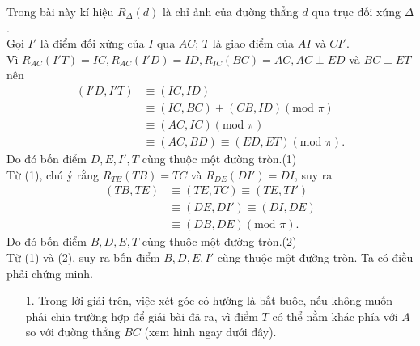 \begin{bt}
{\begin{center}
\begin{tikzpicture}
			\end{tikzpicture}
		\end{center}
		Trong bài này kí hiệu $R_{\Delta}(d)$ là chỉ ảnh của đường thẳng $d$ qua trục đối xứng $\Delta$.\\
		Gọi $I'$ là điểm đối xứng của $I$ qua $AC$; $T$ là giao điểm của $AI$ và $CI'$.\\
		Vì $R_{AC}(I'T)=IC,R_{AC}(I'D)=ID,R_{IC}(BC)=AC,AC\perp ED$ và $BC\perp ET$ nên 
		\begin{align*}
		(I'D,I'T)&\equiv (IC,ID)\\ &\equiv (IC,BC)+(CB,ID)(\text{mod } \pi)\\&\equiv (AC,IC)(\text{mod }\pi)\\&\equiv(AC,BD)\equiv (ED,ET)(\text{mod }\pi).
		\end{align*}
		Do đó bốn điểm $D,E,I',T$ cùng thuộc một đường tròn.\hfill(1)\\
		Từ (1), chú ý rằng $R_{TE}(TB)=TC$ và $R_{DE}(DI')=DI$, suy ra
		\begin{align*}
		(TB,TE)&\equiv (TE,TC)\equiv(TE,TI')\\ &\equiv (DE,DI')\equiv(DI,DE)\\&\equiv (DB,DE)(\text{mod }\pi).
		\end{align*}
		Do đó bốn điểm $B,D,E,T$ cùng thuộc một đường tròn.\hfill(2)\\
		Từ (1) và (2), suy ra bốn điểm $B,D,E,I'$ cùng thuộc một đường tròn. Ta có điều phải chứng minh.
		\begin{nx}\hfill
			\begin{enumerate}
				\item[1.] Trong lời giải trên, việc xét góc có hướng là bắt buộc, nếu không muốn phải chia trường hợp để giải bài đã ra, vì điểm $T$ có thể nằm khác phía với $A$ so với đường thẳng $BC$ (xem hình ngay dưới đây).\\
				\begin{center}
\end{center}
\end{enumerate}
\end{nx}}
\end{bt}
